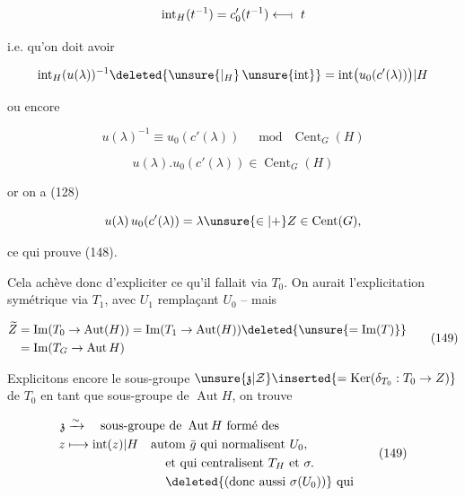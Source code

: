 


\[
\operatorname{int}_H(t^{-1})=c'_0(t^{-1})\longleftarrow\joinrel\shortmid\ t
\]

i.e. qu'on doit avoir

\[
\operatorname{int}_H(u(\lambda))^{-1}\deleted{\unsure{\vert_H}\,\unsure{\operatorname{int}}}
=\operatorname{int}\bigl(u_0(c'(\lambda))\bigr)|H
\]

ou encore

\[
u(\lambda)^{-1}\equiv u_0(c'(\lambda))\quad\bmod\ \operatorname{Cent}_G(H)
\]


\[
u(\lambda).u_0(c'(\lambda))\in\operatorname{Cent}_G(H)
\]

or on a (128)

\[
u(\lambda)\,u_0(c'(\lambda))=\lambda\unsure{\in|+}Z\in\operatorname{Cent}(G),
\]

ce qui  prouve (148).

Cela achève donc d'expliciter ce qu'il fallait via $T_0$. On aurait l'explicitation symétrique via $T_1$, avec $U_1$ remplaçant $U_0$ -- mais  

\[
\begin{aligned}
\widetilde Z &=\operatorname{Im}(T_0\to\operatorname{Aut}(H))=\operatorname{Im}(T_1\to\operatorname{Aut}(H))\deleted{\unsure{=\operatorname{Im}(T)}}\\
&=\operatorname{Im}(T_G\to\operatorname{Aut} H)
\end{aligned}\tag*{(149)}
\]

 Explicitons encore le sous-groupe $\unsure{\mathfrak z|\mathcal Z}\inserted{=\operatorname{Ker}(\delta_{T_0}:T_0\to Z)}$ de $T_0$ en tant que sous-groupe de $\operatorname{Aut} H$, on trouve 

\[
\begin{aligned}
\mathfrak z&\xrightarrow{\sim}\quad\text{sous-groupe de }\operatorname{Aut}H\ \text{formé des}\\
z&\longmapsto\operatorname{int}(z)|H\quad \text{autom }\bar g\ \text{qui normalisent }U_0,\\
&\hspace{8em}\text{et qui centralisent }T_H\ \text{et }\sigma.\\
&\hspace{8em}\deleted{\text{(donc aussi }\sigma(U_0)\text{)}}\ \text{qui}
\end{aligned}\tag*{(149)}
\]
